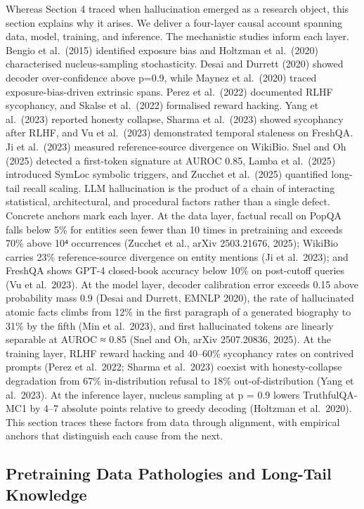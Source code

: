 Whereas Section 4 traced when hallucination emerged as a research object, this section explains why it arises. We deliver a four-layer causal account spanning data, model, training, and inference. The mechanistic studies inform each layer. Bengio et al.~(2015) identified exposure bias and Holtzman et al.~(2020) characterised nucleus-sampling stochasticity. Desai and Durrett (2020) showed decoder over-confidence above p=0.9, while Maynez et al.~(2020) traced exposure-bias-driven extrinsic spans. Perez et al.~(2022) documented RLHF sycophancy, and Skalse et al.~(2022) formalised reward hacking. Yang et al.~(2023) reported honesty collapse, Sharma et al.~(2023) showed sycophancy after RLHF, and Vu et al.~(2023) demonstrated temporal staleness on FreshQA. Ji et al.~(2023) measured reference-source divergence on WikiBio. Snel and Oh (2025) detected a first-token signature at AUROC 0.85, Lamba et al.~(2025) introduced SymLoc symbolic triggers, and Zucchet et al.~(2025) quantified long-tail recall scaling. LLM hallucination is the product of a chain of interacting statistical, architectural, and procedural factors rather than a single defect. Concrete anchors mark each layer. At the data layer, factual recall on PopQA falls below 5\% for entities seen fewer than 10 times in pretraining and exceeds 70\% above 10⁴ occurrences (Zucchet et al., arXiv 2503.21676, 2025); WikiBio carries 23\% reference-source divergence on entity mentions (Ji et al.~2023); and FreshQA shows GPT-4 closed-book accuracy below 10\% on post-cutoff queries (Vu et al.~2023). At the model layer, decoder calibration error exceeds 0.15 above probability mass 0.9 (Desai and Durrett, EMNLP 2020), the rate of hallucinated atomic facts climbs from 12\% in the first paragraph of a generated biography to 31\% by the fifth (Min et al.~2023), and first hallucinated tokens are linearly separable at AUROC ≈ 0.85 (Snel and Oh, arXiv 2507.20836, 2025). At the training layer, RLHF reward hacking and 40--60\% sycophancy rates on contrived prompts (Perez et al.~2022; Sharma et al.~2023) coexist with honesty-collapse degradation from 67\% in-distribution refusal to 18\% out-of-distribution (Yang et al.~2023). At the inference layer, nucleus sampling at p = 0.9 lowers TruthfulQA-MC1 by 4--7 absolute points relative to greedy decoding (Holtzman et al.~2020). This section traces these factors from data through alignment, with empirical anchors that distinguish each cause from the next.

\subsection{Pretraining Data Pathologies and Long-Tail Knowledge}\label{pretraining-data-pathologies-and-long-tail-knowledge}

